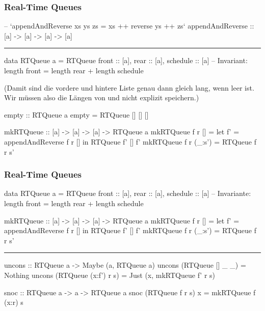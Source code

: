 \documentclass{beamer}
\begin{document}
\begin{frame}[t,fragile]
  \frametitle{Real-Time Queues}
\begin{haskellcode}
-- `appendAndReverse xs ys zs = xs ++ reverse ys ++ zs`
appendAndReverse :: [a] -> [a] -> [a] -> [a]
\end{haskellcode}
{\noindent \color{gray} \rule{\textwidth}{0.4pt}}\begin{haskellcode}
data RTQueue a =
  RTQueue { front :: [a], rear :: [a], schedule :: [a] }
-- Invariant: length front = length rear + length schedule
\end{haskellcode}

  (Damit sind die vordere und hintere Liste genau dann gleich lang, wenn  leer ist.
  Wir müssen also die Längen von  und  nicht explizit speichern.)

\begin{haskellcode}
empty :: RTQueue a
empty = RTQueue [] [] []

mkRTQueue :: [a] -> [a] -> [a] -> RTQueue a
mkRTQueue f r [] = let f' = appendAndReverse f r []
                   in RTQueue f' [] f'
mkRTQueue f r (_:s') = RTQueue f r s'
\end{haskellcode}

\end{frame}

\begin{frame}[t,fragile]
  \frametitle{Real-Time Queues}
\begin{haskellcode}
data RTQueue a =
  RTQueue { front :: [a], rear :: [a], schedule :: [a] }
-- Invariante: length front = length rear + length schedule

mkRTQueue :: [a] -> [a] -> [a] -> RTQueue a
mkRTQueue f r [] = let f' = appendAndReverse f r []
                   in RTQueue f' [] f'
mkRTQueue f r (_:s') = RTQueue f r s'
\end{haskellcode}
{ \noindent \color{gray} \rule{\textwidth}{0.4pt}}\begin{haskellcode}
uncons :: RTQueue a -> Maybe (a, RTQueue a)
uncons (RTQueue []     _ _) = Nothing
uncons (RTQueue (x:f') r s) =
  Just (x, mkRTQueue f' r s)

snoc :: RTQueue a -> a -> RTQueue a
snoc (RTQueue f r s) x = mkRTQueue f (x:r) s
\end{haskellcode}
\end{frame}
\end{document}

